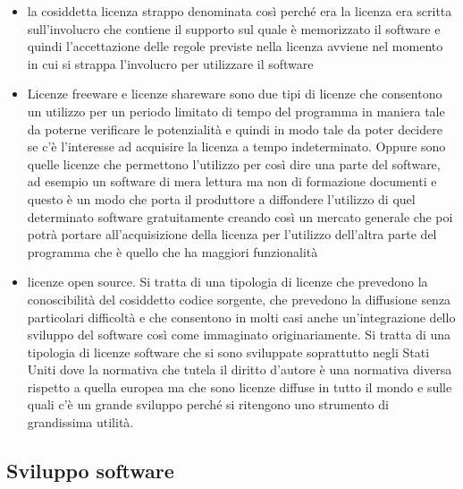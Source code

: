 \begin{itemize}
\begin{itemize}
    \item la cosiddetta licenza strappo denominata così perché era la licenza era scritta sull'involucro che contiene il supporto sul quale è memorizzato il software e quindi l'accettazione delle regole previste nella licenza avviene nel momento in cui si strappa l'involucro per utilizzare il software
    \item Licenze freeware e licenze shareware sono due tipi di licenze che consentono un utilizzo per un periodo limitato di tempo del programma in maniera tale da poterne verificare le potenzialità e quindi in modo tale da poter decidere se c'è l'interesse ad acquisire la licenza a tempo indeterminato. Oppure sono quelle licenze che permettono l'utilizzo per così dire una parte del software, ad esempio un software di mera lettura ma non di formazione documenti e questo è un modo che porta il produttore a diffondere l'utilizzo di quel determinato software gratuitamente creando così un mercato generale che poi potrà portare all'acquisizione della licenza per l'utilizzo dell'altra parte del programma che è quello che ha maggiori funzionalità
    \item licenze open source. Si tratta di una tipologia di licenze che prevedono la conoscibilità del cosiddetto codice sorgente, che prevedono la diffusione senza particolari difficoltà e che consentono in molti casi anche un'integrazione dello sviluppo del software così come immaginato originariamente. Si tratta di una tipologia di licenze software che si sono sviluppate soprattutto negli Stati Uniti dove la normativa che tutela il diritto d'autore è una normativa diversa rispetto a quella europea ma che sono licenze diffuse in tutto il mondo e sulle quali c'è un grande sviluppo perché si ritengono uno strumento di grandissima utilità. 
\end{itemize}

\subsection{Sviluppo software}


\end{itemize}
